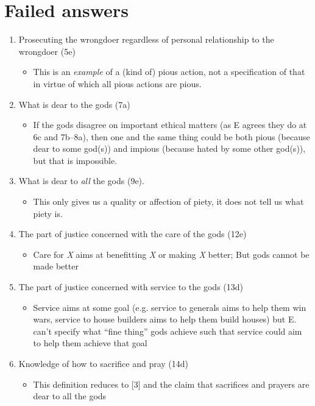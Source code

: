 \documentclass[oneside]{article}
\begin{document}
\section*{Failed answers}
\begin{enumerate}

\item Prosecuting the wrongdoer regardless of personal relationship to the wrongdoer (5e)

\begin{itemize}\item{This is an \emph{example} of a (kind of) pious action, not a specification of that in virtue of which all pious actions are pious.}\end{itemize}

\item{What is dear to the gods (7a)}

\begin{itemize}\item{If the gods disagree on important ethical matters (as E agrees they do at 6c and 7b--8a), then one and the same thing could be both pious (because dear to some god(s)) and impious (because hated by some other god(s)), but that is impossible.}\end{itemize}

\item{What is dear to \emph{all} the gods (9e).}

\begin{itemize}\item{This only gives us a quality or affection of piety, it does not tell us what piety is.}\end{itemize}

\item{The part of justice concerned with the care of the gods (12e)}

\begin{itemize}\item{Care for \emph{X} aims at benefitting \emph{X} or making \emph{X} better; But gods cannot be made better}\end{itemize}

\item{The part of justice concerned with service to the gods (13d)}

\begin{itemize}\item{Service aims at some goal (e.g. service to generals aims to help them win wars, service to house builders aims to help them build houses) but E. can't specify what ``fine thing'' gods achieve such that service could aim to help them achieve that goal}\end{itemize} 

\item{Knowledge of how to sacrifice and pray (14d)}

\begin{itemize}\item{This definition reduces to [3] and the claim that sacrifices and prayers are dear to all the gods}\end{itemize}

\end{enumerate}
\end{document}
